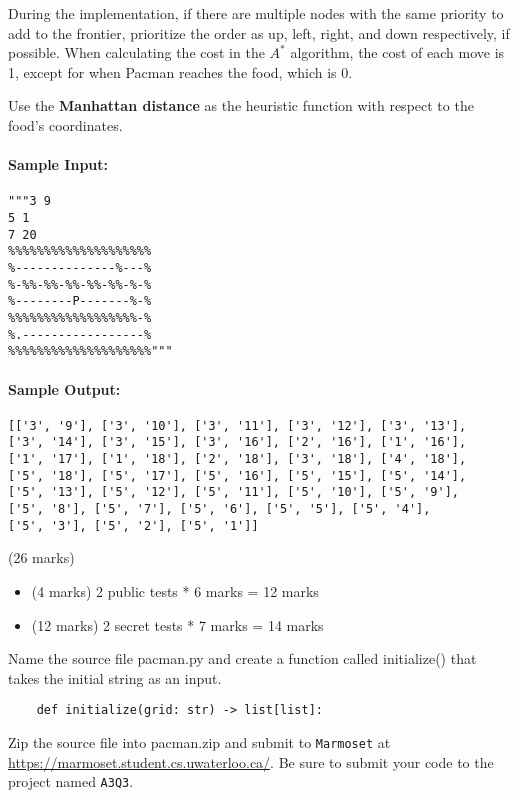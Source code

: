 \documentclass[12pt]{article}
\begin{document}
During the implementation, if there are multiple nodes with the same priority to add to the frontier, prioritize the order as up, left, right, and down respectively, if possible. When calculating the cost in the $A^{*}$ algorithm, the cost of each move is 1, except for when Pacman reaches the food, which is 0.

Use the \textbf{Manhattan distance} as the heuristic function with respect to the food's coordinates.

\paragraph{Sample Input:}
\begin{verbatim}
"""3 9
5 1
7 20
%%%%%%%%%%%%%%%%%%%%
%--------------%---%
%-%%-%%-%%-%%-%%-%-%
%--------P-------%-%
%%%%%%%%%%%%%%%%%%-%
%.-----------------%
%%%%%%%%%%%%%%%%%%%%"""
\end{verbatim}

\paragraph{Sample Output:}
\begin{verbatim}
[['3', '9'], ['3', '10'], ['3', '11'], ['3', '12'], ['3', '13'], 
['3', '14'], ['3', '15'], ['3', '16'], ['2', '16'], ['1', '16'], 
['1', '17'], ['1', '18'], ['2', '18'], ['3', '18'], ['4', '18'], 
['5', '18'], ['5', '17'], ['5', '16'], ['5', '15'], ['5', '14'], 
['5', '13'], ['5', '12'], ['5', '11'], ['5', '10'], ['5', '9'], 
['5', '8'], ['5', '7'], ['5', '6'], ['5', '5'], ['5', '4'], 
['5', '3'], ['5', '2'], ['5', '1']]
\end{verbatim}

\begin{markscheme} (26 marks)
    \begin{itemize}
        \item (4 marks) 2 public tests * 6 marks = 12 marks
        \item (12 marks) 2 secret tests * 7 marks = 14 marks
    \end{itemize}
\end{markscheme}

Name the source file pacman.py and create a function called initialize() that takes the initial string as an input.
\begin{verbatim}
    def initialize(grid: str) -> list[list]:
\end{verbatim}
Zip the source file into pacman.zip and submit to \verb+Marmoset+ at \url{https://marmoset.student.cs.uwaterloo.ca/}. Be sure to submit your code to the project named \texttt{A3Q3}.
\end{document}
